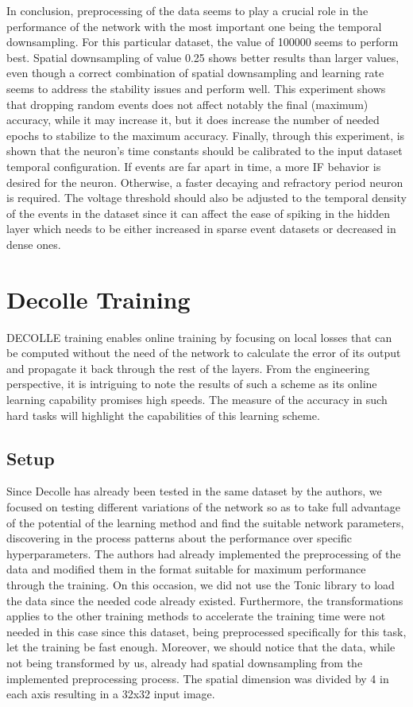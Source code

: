 \documentclass[12pt]{report}
\begin{document}
In conclusion, preprocessing of the data seems to play a crucial role in the performance of the network with the most important one being the temporal downsampling. For this particular dataset, the value of 100000 seems to perform best. Spatial downsampling of value 0.25 shows better results than larger values, even though a correct combination of spatial downsampling and learning rate seems to address the stability issues and perform well. This experiment shows that dropping random events does not affect notably the final (maximum) accuracy, while it may increase it, but it does increase the number of needed epochs to stabilize to the maximum accuracy. Finally, through this experiment, is shown that the neuron's time constants should be calibrated to the input dataset temporal configuration. If events are far apart in time, a more IF behavior is desired for the neuron. Otherwise, a faster decaying and refractory period neuron is required. The voltage threshold should also be adjusted to the temporal density of the events in the dataset since it can affect the ease of spiking in the hidden layer which needs to be either increased in sparse event datasets or decreased in dense ones.

\section{Decolle Training}

DECOLLE training \cite{kaiser2020} enables online training by focusing on local losses that can be computed without the need of the network to calculate the error of its output and propagate it back through the rest of the layers. From the engineering perspective, it is intriguing to note the results of such a scheme as its online learning capability promises high speeds. The measure of the accuracy in such hard tasks will highlight the capabilities of this learning scheme.

\subsection{Setup}

Since Decolle has already been tested in the same dataset by the authors, we focused on testing different variations of the network so as to take full advantage of the potential of the learning method and find the suitable network parameters, discovering in the process patterns about the performance over specific hyperparameters. The authors had already implemented the preprocessing of the data and modified them in the format suitable for maximum performance through the training. On this occasion, we did not use the Tonic library to load the data since the needed code already existed. Furthermore, the transformations applies to the other training methods to accelerate the training time were not needed in this case since this dataset, being preprocessed specifically for this task, let the training be fast enough. Moreover, we should notice that the data, while not being transformed by us, already had spatial downsampling from the implemented preprocessing process. The spatial dimension was divided by 4 in each axis resulting in a 32x32 input image.
\end{document}
